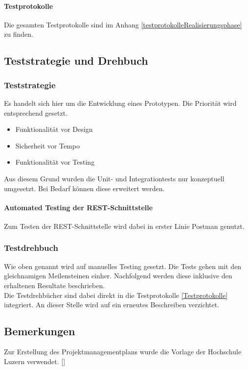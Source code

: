 \paragraph{Testprotokolle}
Die gesamten Testprotokolle sind im Anhang \ref{testprotokolleRealisierungsphase} zu finden. 
\newpage
\subsection{Teststrategie und Drehbuch}
\subsubsection{Teststrategie}
Es handelt sich hier um die Entwicklung eines Prototypen. Die Priorität wird entsprechend gesetzt. 
\begin{itemize}
	\item Funktionalität vor Design
	\item Sicherheit vor Tempo
	\item Funktionalität vor Testing
\end{itemize}
Aus diesem Grund wurden die Unit- und Integrationtests nur konzeptuell umgesetzt. Bei Bedarf können diese erweitert werden. 

\paragraph{Automated Testing der REST-Schnittstelle}
Zum Testen der REST-Schnittstelle wird dabei in erster Linie Postman genutzt. 

\subsubsection{Testdrehbuch}\label{testsvonmeilensteine}
Wie oben genannt wird auf manuelles Testing gesetzt. 
Die Tests gehen mit den gleichnamigen Meilensteinen einher.
Nachfolgend werden diese inklusive den erhaltenen Resultate beschrieben.\\

Die Testdrehbücher sind dabei direkt in die Testprotokolle \ref{Testprotokolle} integriert. An dieser Stelle wird auf ein erneutes Beschreiben verzichtet. 

\subsection{Bemerkungen}
Zur Erstellung des Projektmanagementplans wurde die Vorlage der Hochschule Luzern verwendet. [\cite{pmpHSLU}]
\newpage
